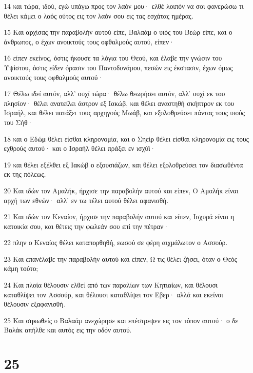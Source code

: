 \par 14 και τώρα, ιδού, εγώ υπάγω προς τον λαόν μου· ελθέ λοιπόν να σοι φανερώσω τι θέλει κάμει ο λαός ούτος εις τον λαόν σου εις τας εσχάτας ημέρας.
\par 15 Και αρχίσας την παραβολήν αυτού είπε, Βαλαάμ ο υιός του Βεώρ είπε, και ο άνθρωπος, ο έχων ανοικτούς τους οφθαλμούς αυτού, είπεν·
\par 16 είπεν εκείνος, όστις ήκουσε τα λόγια του Θεού, και έλαβε την γνώσιν του Υψίστου, όστις είδεν όρασιν του Παντοδυνάμου, πεσών εις έκστασιν, έχων όμως ανοικτούς τους οφθαλμούς αυτού·
\par 17 Θέλω ιδεί αυτόν, αλλ' ουχί τώρα· θέλω θεωρήσει αυτόν, αλλ' ουχί εκ του πλησίον· θέλει ανατείλει άστρον εξ Ιακώβ, και θέλει αναστηθή σκήπτρον εκ του Ισραήλ, και θέλει πατάξει τους αρχηγούς Μωάβ, και εξολοθρεύσει πάντας τους υιούς του Σήθ·
\par 18 και ο Εδώμ θέλει είσθαι κληρονομία, και ο Σηείρ θέλει είσθαι κληρονομία εις τους εχθρούς αυτού· και ο Ισραήλ θέλει πράξει εν ισχύϊ·
\par 19 και θέλει εξέλθει εξ Ιακώβ ο εξουσιάζων, και θέλει εξολοθρεύσει τον διασωθέντα εκ της πόλεως.
\par 20 Και ιδών τον Αμαλήκ, ήρχισε την παραβολήν αυτού και είπεν, Ο Αμαλήκ είναι αρχή των εθνών· αλλ' εν τω τέλει αυτού θέλει αφανισθή.
\par 21 Και ιδών τον Κεναίον, ήρχισε την παραβολήν αυτού και είπεν, Ισχυρά είναι η κατοικία σου, και θέτεις την φωλεάν σου επί την πέτραν·
\par 22 πλην ο Κεναίος θέλει καταπορθηθή, εωσού σε φέρη αιχμάλωτον ο Ασσούρ.
\par 23 Και επανέλαβε την παραβολήν αυτού και είπεν, Ω τις θέλει ζήσει, όταν ο Θεός κάμη τούτο;
\par 24 Και πλοία θέλουσιν ελθεί από των παραλίων των Κητιαίων, και θέλουσι καταθλίψει τον Ασσούρ, και θέλουσι καταθλίψει τον Εβερ· αλλά και εκείνοι θέλουσιν εξαφανισθή.
\par 25 Και σηκωθείς ο Βαλαάμ ανεχώρησε και επέστρεψεν εις τον τόπον αυτού· ο δε Βαλάκ απήλθε και αυτός εις την οδόν αυτού.

\chapter{25}

